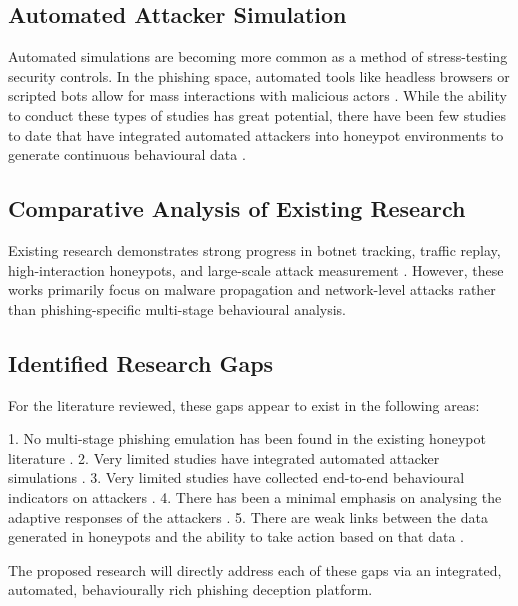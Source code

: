 \subsection{Automated Attacker Simulation}

Automated simulations are becoming more common as a method of stress-testing security controls. In the phishing space, automated tools like headless browsers or scripted bots allow for mass interactions with malicious actors \cite{Kreibich2005Replay,Alata2006Honeynet}. While the ability to conduct these types of studies has great potential, there have been few studies to date that have integrated automated attackers into honeypot environments to generate continuous behavioural data \cite{Bringer2012HoneypotSurvey}.

\subsection{Comparative Analysis of Existing Research}

Existing research demonstrates strong progress in botnet tracking, traffic replay, high-interaction honeypots, and large-scale attack measurement \cite{Bailey2009Botnets,Rajab2007Botnet,Freiling2010Evasion}. However, these works primarily focus on malware propagation and network-level attacks rather than phishing-specific multi-stage behavioural analysis.

\subsection{Identified Research Gaps}
For the literature reviewed, these gaps appear to exist in the following areas:

1. No multi-stage phishing emulation has been found in the existing honeypot literature \cite{Bringer2012HoneypotSurvey}.
2. Very limited studies have integrated automated attacker simulations \cite{Kreibich2005Replay}.
3. Very limited studies have collected end-to-end behavioural indicators on attackers \cite{Song2005HoneyStat}.
4. There has been a minimal emphasis on analysing the adaptive responses of the attackers \cite{Freiling2010Evasion}.
5. There are weak links between the data generated in honeypots and the ability to take action based on that data \cite{Bringer2012HoneypotSurvey}.

The proposed research will directly address each of these gaps via an integrated, automated, behaviourally rich phishing deception platform.

